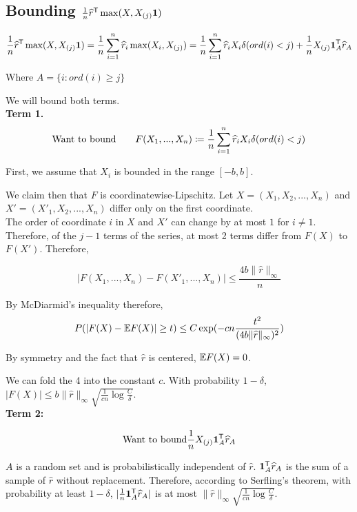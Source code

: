 \documentclass{article}
\begin{document}
\subsection{Bounding $\frac{1}{n} \widehat{r}^{\mathsf{T}} \max( X, X_{(j)} \mathbf{1})$}
\[
\frac{1}{n} \widehat{r}^{\mathsf{T}} \max(X, X_{(j)} \mathbf{1}) = \frac{1}{n} \sum_{i=1}^n \widehat{r}_i \max(X_i, X_{(j)}) = \frac{1}{n} \sum_{i=1}^n \widehat{r}_i X_i \delta(ord(i) < j) + \frac{1}{n} X_{(j)} \mathbf{1}_A^{\mathsf{T}} \widehat{r}_A
\]

Where $A = \{ i : ord(i) \geq j\}$

We will bound both terms.\\

\textbf{Term 1.}
\[
\textrm{Want to bound} \qquad F(X_1,...,X_n) \coloneqq \frac{1}{n}\sum_{i=1}^n \widehat{r}_i X_i \delta(ord(i) < j) 
\]

First, we assume that $X_i$ is bounded in the range $[-b,b]$. 

We claim then that $F$ is coordinatewise-Lipschitz. Let $X = (X_1, X_2,...,X_n)$ and $X' = (X'_1, X_2, ..., X_n)$ differ only on the first coordinate. \\

The order of coordinate $i$ in $X$ and $X'$ can change by at most $1$ for $i \neq 1$. Therefore, of the $j-1$ terms of the series, at most 2 terms differ from $F(X)$ to $F(X')$. Therefore,

$$ | F(X_1, ..., X_n) - F(X'_1, ..., X_n) | \leq \frac{4 b \|\hat{r}\|_\infty}{n} $$

By McDiarmid's inequality therefore, 
\[
P( | F(X) - \mathbb{E} F(X) | \geq t ) \leq C \exp( - c n\frac{t^2}{ (4 b \|\widehat{r}\|_\infty)^2})
\]

By symmetry and the fact that $\hat{r}$ is centered, $\mathbb{E} F(X) = 0$.

We can fold the 4 into the constant $c$. With probability $1-\delta$, $|F(X)| \leq b \|\hat{r}\|_\infty \sqrt{   \frac{1}{cn} \log \frac{C}{\delta}}$. \\

\textbf{Term 2:}

\[
\textrm{Want to bound}   \frac{1}{n} X_{(j)} \mathbf{1}_A^{\mathsf{T}} \widehat{r}_A
\]

$A$ is a random set and is probabilistically independent of $\hat{r}$.  $\mathbf{1}_A^{\mathsf{T}} \widehat{r}_A$ is the sum of a sample of $\hat{r}$ without replacement. Therefore, according to Serfling's theorem, with probability at least $1-\delta$, $|\frac{1}{n} \mathbf{1}_A^{\mathsf{T}} \widehat{r}_A|$ is at most $\| \hat{r} \|_\infty \sqrt{ \frac{1}{cn} \log \frac{C}{\delta}}$.
\end{document}
